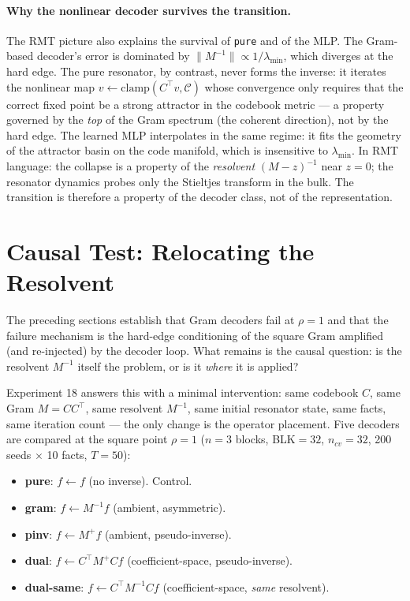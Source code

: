 \documentclass[11pt,a4paper]{article}
\begin{document}
\paragraph{Why the nonlinear decoder survives the transition.} The RMT picture also explains the survival of \texttt{pure} and of the MLP. The Gram-based decoder's error is dominated by $\|M^{-1}\| \propto 1/\lambda_{\min}$, which diverges at the hard edge. The pure resonator, by contrast, never forms the inverse: it iterates the nonlinear map $v \leftarrow \mathrm{clamp}(C^{\top} v, \mathcal{C})$ whose convergence only requires that the correct fixed point be a strong attractor in the codebook metric --- a property governed by the \emph{top} of the Gram spectrum (the coherent direction), not by the hard edge. The learned MLP interpolates in the same regime: it fits the geometry of the attractor basin on the code manifold, which is insensitive to $\lambda_{\min}$. In RMT language: the collapse is a property of the \emph{resolvent} $(M - z)^{-1}$ near $z=0$; the resonator dynamics probes only the Stieltjes transform in the bulk. The transition is therefore a property of the decoder class, not of the representation.

\section{Causal Test: Relocating the Resolvent}
\label{sec:exp18}

The preceding sections establish that Gram decoders fail at $\rho=1$ and that the failure mechanism is the hard-edge conditioning of the square Gram amplified (and re-injected) by the decoder loop. What remains is the causal question: is the resolvent $M^{-1}$ itself the problem, or is it \emph{where} it is applied?

Experiment 18 answers this with a minimal intervention: same codebook $C$, same Gram $M = CC^{\top}$, same resolvent $M^{-1}$, same initial resonator state, same facts, same iteration count --- the only change is the operator placement. Five decoders are compared at the square point $\rho=1$ ($n=3$ blocks, BLK$=32$, $n_{cv}=32$, 200 seeds $\times$ 10 facts, $T=50$):

\begin{itemize}
  \item \textbf{pure}: $f \leftarrow f$ (no inverse). Control.
  \item \textbf{gram}: $f \leftarrow M^{-1} f$ (ambient, asymmetric).
  \item \textbf{pinv}: $f \leftarrow M^{+} f$ (ambient, pseudo-inverse).
  \item \textbf{dual}: $f \leftarrow C^{\top} M^{+} C f$ (coefficient-space, pseudo-inverse).
  \item \textbf{dual-same}: $f \leftarrow C^{\top} M^{-1} C f$ (coefficient-space, \emph{same} resolvent).
\end{itemize}
\end{document}

